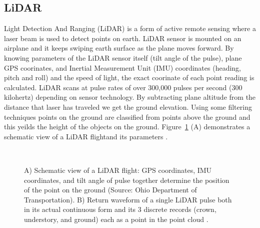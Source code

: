 \subsection{LiDAR}

Light Detection And Ranging (LiDAR) is a form of active remote sensing where a laser beam is used to detect points on earth. LiDAR sensor is mounted on an airplane and it keeps swiping earth surface as the plane moves forward. By knowing parameters of the LiDAR sensor itself (tilt angle of the pulse), plane GPS coorinates, and Inertial Measurement Unit (IMU) coordinates (heading, pitch and roll) and the speed of light, the exact coorinate of each point reading is calculated. LiDAR scans at pulse rates of over 300,000 pulses per second (300 kilohertz) depending on sensor technology. By subtracting plane altitude from the distance that laser has traveled we get the ground elevation.  Using some filtering techniques points on the ground are classified from points above the ground and this yeilds the height of the objects on the ground. Figure~\ref{fig:lidar} (A) demonstrates a schematic view of a LiDAR flightand its parameters \citep{schmid2008lidar}.


\begin{figure}[b!]
  \begin{center}
    \centering
    \mbox{
       \quad
       \quad
     }
    
    \caption[Schematic view of a LiDAR flight]{A) Schematic view of a LiDAR flight: GPS coordinates, IMU coordinates, and tilt angle of pulse together determine the position of the point on the ground (Source: Ohio Department of Transportation). B) Return waveform of a single LiDAR pulse both in its actual continuous form and its 3 discrete records (crown, understory, and ground) each as a point in the point cloud \citep{fernandez2014now}.}
    \label{fig:lidar}
  \end{center}
\end{figure}






